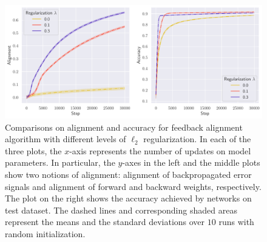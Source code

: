\begin{figure}[t]
  \centering
  \includegraphics[width=\textwidth]{figures/mnist_2l_v6_horizontal.pdf}
  \caption{Comparisons on alignment and accuracy for feedback alignment algorithm with different levels of $\ell_2$ regularization. In each of the three plots, the $x$-axis represents the number of updates on model parameters. In particular, the $y$-axes in the left and the middle plots show two notions of alignment: alignment of backpropagated error signals and alignment of forward and backward weights, respectively. The plot on the right shows the accuracy achieved by networks on test dataset. The dashed lines and corresponding shaded areas represent the means and the standard deviations over $10$ runs with random initialization.}
  \label{fig:mnist}
\end{figure}